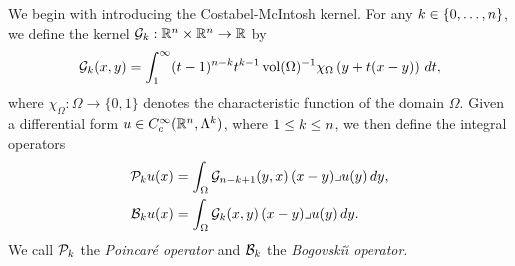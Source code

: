\documentclass[10pt,a4paper]{article}
\begin{document}
We begin with introducing the Costabel-McIntosh kernel.
For any $k \in \{0,\dotsc,n\}$, we define the kernel ${\mathcal G}_{k} : {\mathbb R}^{n} \times {\mathbb R}^{n} \rightarrow {\mathbb R}$ by
\begin{equation}\label{math:mainkernel}
  {\mathcal G}_{k}(x,y) = \int_{1}^\infty (t-1)^{n-k}t^{k-1} \operatorname{vol}(\Omega)^{-1}\chi_{\Omega} \left(y+t(x-y)\right)\,dt
  ,
\end{equation}
where $\chi_{\Omega} : \Omega \rightarrow \{0,1\}$ denotes the characteristic function of the domain $\Omega$.
Given a differential form $u \in {C^\infty_c}({\mathbb R}^n,\Lambda^k)$, where \(1 \leq k \leq n\), 
we then define the integral operators
\begin{align*}
  {\mathcal P}_{k} u(x) &= \int_{\Omega} {\mathcal G}_{n-k+1}(y,x) \,(x-y)\lrcorner u(y)\,dy,
  \\
  {\mathcal B}_{k} u(x) &= \int_{\Omega} {\mathcal G}_{k}(x,y) \,(x-y)\lrcorner u(y)\,dy.
\end{align*}
We call ${\mathcal P}_{k}$ the \emph{Poincar\'e operator} and ${\mathcal B}_{k}$ the \emph{Bogovski\u{\i} operator}. 
\end{document}
